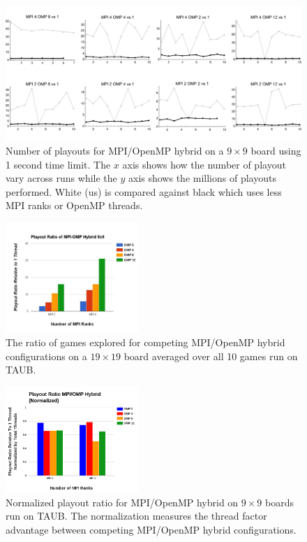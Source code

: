 \documentclass[nocopyrightspace, 10pt]{sigplanconf}
\begin{document}
\begin{figure}
\centering
\includegraphics[width=\textwidth]{war_MPI_OMP_vs.pdf}
\caption{Number of playouts for MPI/OpenMP hybrid on a $9\times 9$ board using 1 second time limit. The $x$ axis shows how the number of playout vary across runs while the $y$ axis shows the millions of playouts performed. White (us) is compared against black which uses less MPI ranks or OpenMP threads.}
\label{fig:playouthybrid}
\end{figure}

\begin{figure} 
\begin{center}
\includegraphics[width=0.45\textwidth]{MPI_OMP_hybrid_9x9_playout.pdf}
\end{center}
\caption{The ratio of games explored for competing MPI/OpenMP hybrid configurations on a $19 \times 19$ board averaged over all 10 games run on TAUB.}
\label{fig:playouthybrid2}
\end{figure}

\begin{figure} 
\begin{center}
\includegraphics[width=0.45\textwidth]{playout_ratio_hybrid.png}
\end{center}
\caption{Normalized playout ratio for MPI/OpenMP hybrid on $9 \times 9$ boards run on TAUB. The normalization measures the thread factor advantage between competing MPI/OpenMP hybrid configurations.}
\label{fig:playouthybrid3}
\end{figure}
\end{document}
